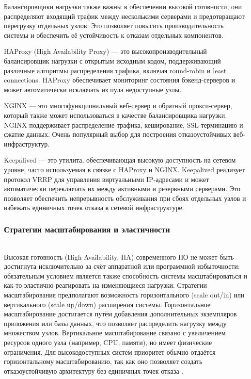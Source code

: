 Балансировщики нагрузки также важны в обеспечении высокой готовности, они распределяют входящий трафик между несколькими серверами и предотвращают перегрузку отдельных узлов. Это позволяет повысить производительность системы и обеспечить её устойчивость к отказам отдельных компонентов.

HAProxy (High Availability Proxy) — это высокопроизводительный балансировщик нагрузки с открытым исходным кодом, поддерживающий различные алгоритмы распределения трафика, включая round-robin и least connections. HAProxy обеспечивает мониторинг состояния бэкенд-серверов и может автоматически исключать из пула недоступные узлы.

NGINX — это многофункциональный веб-сервер и обратный прокси-сервер, который также может использоваться в качестве балансировщика нагрузки. NGINX поддерживает распределение трафика, кеширование, SSL-терминацию и сжатие данных. Очень популярный выбор для построения отказоустойчивых веб-инфраструктур.

Keepalived — это утилита, обеспечивающая высокую доступность на сетевом уровне, часто используемая в связке с HAProxy и NGINX. Keepalived реализует протокол VRRP для управления виртуальными IP-адресами и может автоматически переключать их между активными и резервными серверами. Это позволяет обеспечить непрерывность обслуживания при сбоях отдельных узлов и избежать единичных точек отказа в сетевой инфраструктуре.

\subsubsection{Стратегии масштабирования и эластичности} ~\\

Высокая готовность (High Availability, HA) современного ПО не может быть достигнута исключительно за счёт аппаратной или программной избыточности: обязательным условием является также способность системы масштабироваться и как-то эластично реагировать на изменяющиеся нагрузки.
Стратегии масштабирования предполагают возможность горизонтального (scale out/in) или вертикального (scale up/down) расширения системы. Горизонтальное масштабирование достигается путём добавления дополнительных экземпляров приложения или базы данных, что позволяет распределить нагрузку между множеством узлов. Вертикальное масштабирование связано с увеличением ресурсов одного узла (например, CPU, памяти), но имеет физические ограничения. Для высокодоступных систем приоритет обычно отдаётся горизонтальному масштабированию, так как оно позволяет создать отказоустойчивую архитектуру без единичных точек отказа \autocite{AvailMashtab}.


